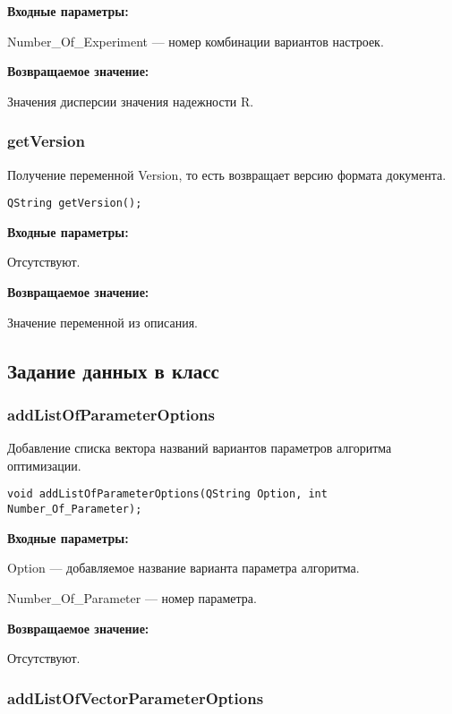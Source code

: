 \documentclass[a4paper,12pt]{article}
\begin{document}
\textbf{Входные параметры:}

Number\_Of\_Experiment --- номер комбинации вариантов настроек.

\textbf{Возвращаемое значение:}

Значения дисперсии значения надежности R.


\subsubsection{getVersion}\label{getVersion}

Получение переменной Version, то есть возвращает версию формата документа.


\begin{lstlisting}[label=code_syntax_getVersion,caption=Синтаксис]
QString getVersion();
\end{lstlisting}

\textbf{Входные параметры:}

Отсутствуют.

\textbf{Возвращаемое значение:}

Значение переменной из описания.


\subsection{Задание данных в класс}

\subsubsection{addListOfParameterOptions}\label{addListOfParameterOptions}

Добавление списка вектора названий вариантов параметров алгоритма оптимизации.


\begin{lstlisting}[label=code_syntax_addListOfParameterOptions,caption=Синтаксис]
void addListOfParameterOptions(QString Option, int Number_Of_Parameter);
\end{lstlisting}

\textbf{Входные параметры:}

Option --- добавляемое название варианта параметра алгоритма.
 
    Number\_Of\_Parameter --- номер параметра.

\textbf{Возвращаемое значение:}

Отсутствуют.


\subsubsection{addListOfVectorParameterOptions}\label{addListOfVectorParameterOptions}
\end{document}
